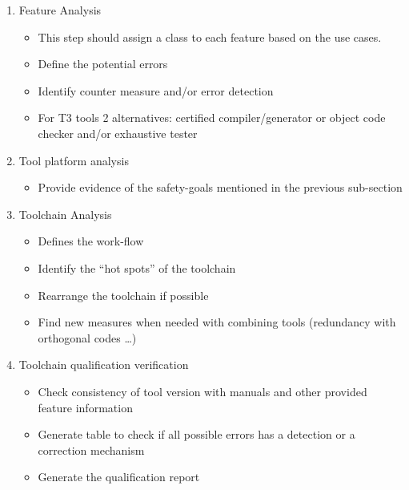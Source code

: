 \begin{enumerate}
\item Feature Analysis
  \begin{itemize}
  \item This step should assign a class to each feature based on the use cases.
  \item Define the potential errors
  \item Identify counter measure and/or error detection
  \item For T3 tools 2 alternatives:  certified compiler/generator or
    object code checker and/or exhaustive tester
  \end{itemize}
\item Tool platform  analysis 
  \begin{itemize}
  \item Provide evidence of the safety-goals mentioned in the
    previous sub-section
  \end{itemize}
\item Toolchain Analysis
  \begin{itemize}
  \item Defines the work-flow
  \item Identify the ``hot spots'' of the toolchain
  \item Rearrange the toolchain if possible
  \item Find new measures when needed with combining tools (redundancy with orthogonal
    codes \ldots{})
  \end{itemize}
\item Toolchain qualification verification 
  \begin{itemize}
  \item Check consistency of tool version with  manuals and other
    provided feature information
  \item Generate table to  check if all possible errors has a
    detection or a correction mechanism
\item Generate the qualification report
  \end{itemize}

\end{enumerate}


